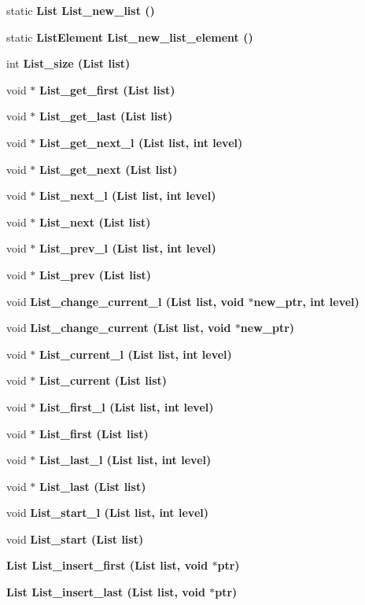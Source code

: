 \begin{CompactItemize}
\item 
static \bf{List} \bf{List\_\-new\_\-list} ()
\item 
static \bf{List\-Element} \bf{List\_\-new\_\-list\_\-element} ()
\item 
int \bf{List\_\-size} (\bf{List} \bf{list})
\item 
void $\ast$ \bf{List\_\-get\_\-first} (\bf{List} \bf{list})
\item 
void $\ast$ \bf{List\_\-get\_\-last} (\bf{List} \bf{list})
\item 
void $\ast$ \bf{List\_\-get\_\-next\_\-l} (\bf{List} \bf{list}, int level)
\item 
void $\ast$ \bf{List\_\-get\_\-next} (\bf{List} \bf{list})
\item 
void $\ast$ \bf{List\_\-next\_\-l} (\bf{List} \bf{list}, int level)
\item 
void $\ast$ \bf{List\_\-next} (\bf{List} \bf{list})
\item 
void $\ast$ \bf{List\_\-prev\_\-l} (\bf{List} \bf{list}, int level)
\item 
void $\ast$ \bf{List\_\-prev} (\bf{List} \bf{list})
\item 
void \bf{List\_\-change\_\-current\_\-l} (\bf{List} \bf{list}, void $\ast$new\_\-ptr, int level)
\item 
void \bf{List\_\-change\_\-current} (\bf{List} \bf{list}, void $\ast$new\_\-ptr)
\item 
void $\ast$ \bf{List\_\-current\_\-l} (\bf{List} \bf{list}, int level)
\item 
void $\ast$ \bf{List\_\-current} (\bf{List} \bf{list})
\item 
void $\ast$ \bf{List\_\-first\_\-l} (\bf{List} \bf{list}, int level)
\item 
void $\ast$ \bf{List\_\-first} (\bf{List} \bf{list})
\item 
void $\ast$ \bf{List\_\-last\_\-l} (\bf{List} \bf{list}, int level)
\item 
void $\ast$ \bf{List\_\-last} (\bf{List} \bf{list})
\item 
void \bf{List\_\-start\_\-l} (\bf{List} \bf{list}, int level)
\item 
void \bf{List\_\-start} (\bf{List} \bf{list})
\item 
\bf{List} \bf{List\_\-insert\_\-first} (\bf{List} \bf{list}, void $\ast$ptr)
\item 
\bf{List} \bf{List\_\-insert\_\-last} (\bf{List} \bf{list}, void $\ast$ptr)
\item 

\end{CompactItemize}
